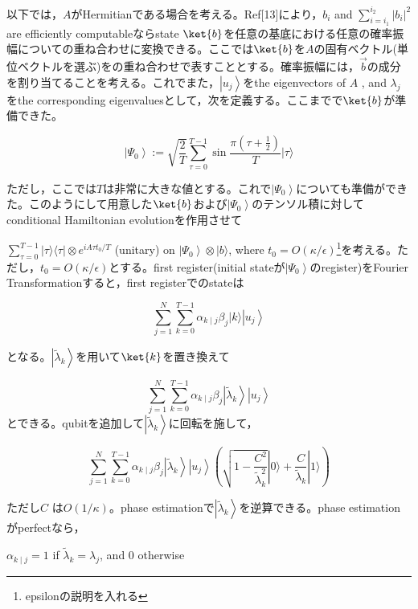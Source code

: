 \documentclass[b5paper,papersize,fleqn]{jsarticle}
\begin{document}
以下では，$A$がHermitianである場合を考える。Ref[13]により，$b_{i}$ and $\sum_{i=i_{1}}^{i_{2}}\left|b_{i}\right|^{2}$ are efficiently computableならstate $\ket{b}$を任意の基底における任意の確率振幅についての重ね合わせに変換できる。ここでは$\ket{b}$を$A$の固有ベクトル(単位ベクトルを選ぶ)をの重ね合わせで表すこととする。確率振幅には，$\vec{b}$の成分を割り当てることを考える。これでまた，$\left|u_{j}\right\rangle$をthe eigenvectors of $A$ , and $\lambda_{j}$をthe corresponding eigenvaluesとして，次を定義する。ここまでで$\ket{b}$が準備できた。

$$
\left|\Psi_{0}\right\rangle:=\sqrt{\frac{2}{T}} \sum_{\tau=0}^{T-1} \sin \frac{\pi\left(\tau+\frac{1}{2}\right)}{T}|\tau\rangle
$$

ただし，ここでは$T$は非常に大きな値とする。これで$
\left|\Psi_{0}\right\rangle$についても準備ができた。このようにして用意した$\ket{b}$および$\left|\Psi_{0}\right\rangle$のテンソル積に対してconditional Hamiltonian evolutionを作用させて

$\sum_{\tau=0}^{T-1}|\tau\rangle\langle\tau| \otimes e^{i A \tau t_{0} / T}$ (unitary) on $\left|\Psi_{0}\right\rangle \otimes|b\rangle$, where $t_{0}=O(\kappa / \epsilon)$\footnote{epsilonの説明を入れる}を考える。ただし，$t_{0}=O(\kappa / \epsilon)$とする。first register(initial stateが$\left|\Psi_{0}\right\rangle$のregister)をFourier Transformationすると，first registerでのstateは

$$
\sum_{j=1}^{N} \sum_{k=0}^{T-1} \alpha_{k \mid j} \beta_{j}|k\rangle\left|u_{j}\right\rangle
$$

となる。$\left|\tilde{\lambda}_{k}\right\rangle$を用いて$\ket{k}$を置き換えて

$$
\sum_{j=1}^{N} \sum_{k=0}^{T-1} \alpha_{k \mid j} \beta_{j}\left|\tilde{\lambda}_{k}\right\rangle\left|u_{j}\right\rangle
$$
とできる。qubitを追加して$\left|\tilde{\lambda}_{k}\right\rangle$に回転を施して，

$$
\sum_{j=1}^{N} \sum_{k=0}^{T-1} \alpha_{k \mid j} \beta_{j}\left|\tilde{\lambda}_{k}\right\rangle\left|u_{j}\right\rangle\left(\sqrt{1-\frac{C^{2}}{\tilde{\lambda}_{k}^{2}}}|0\rangle+\frac{C}{\tilde{\lambda}_{k}}|1\rangle\right)
$$

ただし$C$ は$O(1 / \kappa)$。phase estimationで$\left|\tilde{\lambda}_{k}\right\rangle $を逆算できる。phase estimation がperfectなら，

$\alpha_{k \mid j}=1$ if $\tilde{\lambda}_{k}=\lambda_{j}$, and 0 otherwise
\end{document}
